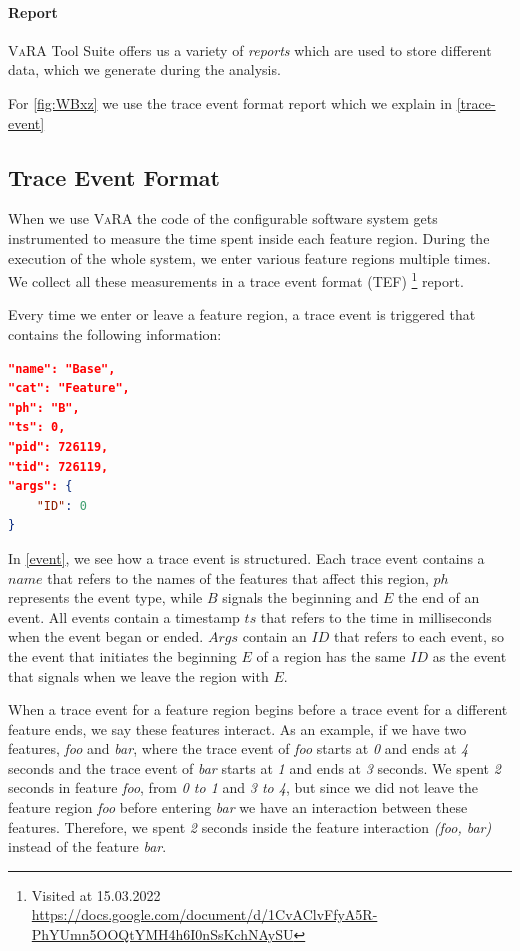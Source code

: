 \paragraph{Report}
\textsc{VaRA} Tool Suite offers us a variety of \emph{reports} which are used to store different data, which we generate during the analysis.

For \autoref{fig:WBxz} we use the trace event format report which we explain in \autoref{trace-event}


\subsection{Trace Event Format}\label{trace-event}
When we use \textsc{VaRA} the code of the configurable software system gets instrumented to measure the time spent inside each feature region. 
During the execution of the whole system, we enter various feature regions multiple times.
We collect all these measurements
in a trace event format (TEF) \footnote{Visited at 15.03.2022 \\ \url{https://docs.google.com/document/d/1CvAClvFfyA5R-PhYUmn5OOQtYMH4h6I0nSsKchNAySU}} report.

Every time we enter or leave a feature region, a trace event is triggered that contains the following information:\\

\begin{minipage}{\linewidth}
\begin{lstlisting}[caption={Trace event},captionpos=b,language=json,firstnumber=1,label={event}]
"name": "Base",
"cat": "Feature",
"ph": "B",
"ts": 0,
"pid": 726119,
"tid": 726119,
"args": {
    "ID": 0
}
\end{lstlisting}
\end{minipage}
In \autoref{event}, we see how a trace event is structured. Each trace event contains a $name$ that refers to the names of the features that affect this
region, $ph$ represents the event type, while $B$ signals the beginning and $E$ the end of an event.
All events contain a timestamp $ts$ that refers to the time in milliseconds when the event began or ended.
$Args$ contain an $ID$ that refers to each event, so the event that initiates the beginning $E$ of a region has the same $ID$ as the event that signals when
we leave the region with $E$.

When a trace event for a feature region begins before a trace event for a different feature ends, we say these features interact. 
As an example, if we have two features, \emph{foo} and \emph{bar}, where the trace event of \emph{foo} starts at \emph{0} and ends at \emph{4} seconds 
and the trace event of \emph{bar} starts at \emph{1} and ends at \emph{3} seconds. We spent \emph{2} seconds in feature \emph{foo}, 
from \emph{0 to 1} and \emph{3 to 4}, 
but since we did not leave the feature region \emph{foo} before entering \emph{bar} we have an interaction between these features. 
Therefore, we spent \emph{2} seconds inside the feature interaction \emph{(foo, bar)} instead of the feature \emph{bar}.

